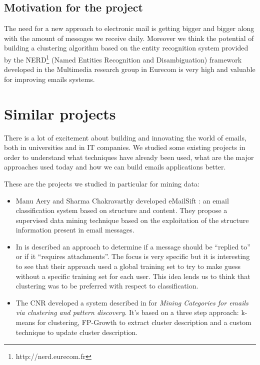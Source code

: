 \documentclass[a4paper,12pt]{report}
\begin{document}
\section{Motivation for the project}

The need for a new approach to electronic mail is getting bigger and bigger along with the amount of messages we receive daily. Moreover we think the potential of building a clustering algorithm based on the entity recognition system provided by the NERD\footnote{http://nerd.eurecom.fr} (Named Entities Recognition and Disambiguation) framework developed in the Multimedia research group in Eurecom is very high and valuable for improving emails systems.


\chapter{Similar projects}

There is a lot of excitement about building and innovating the world of emails, both in universities and in IT companies. We studied some existing projects in order to understand what techniques have already been used, what are the major approaches used today and how we can build emails applications better.


These are the projects we studied in particular for mining data:
\begin{itemize}
\item Manu Aery and Sharma Chakravarthy developed eMailSift \cite{Aery2005}: an email classification system based on structure and content. They propose a supervised data mining technique based on the exploitation of the structure information present in email messages.
\item In \cite{Drezde2008} is described an approach to determine if a message should be ``replied to'' or if it ``requires attachments''. The focus is very specific but it is interesting to see that their approach used a global training set to try to make guess without a specific training set for each user. This idea lends us to think that clustering was to be preferred with respect to classification.
\item The CNR developed a system described in \cite{Manco2008} for \emph{Mining Categories for emails via clustering and pattern discovery}. It's based on a three step approach: k-means for clustering, FP-Growth to extract cluster description and a custom technique to update cluster description.
\end{itemize}
\end{document}
